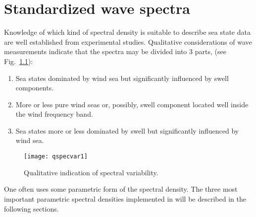 %
\chapter{Standardized wave spectra}
\label{cha:waveSpectra}
Knowledge of which kind of spectral density is suitable to describe
sea state data are well established from experimental studies.
Qualitative considerations of wave measurements indicate that the
spectra may be divided into 3 parts, (see Fig.~\ref{fig:qspecvar20}):
\begin{enumerate}\setlength\itemsep{0mm}
\item Sea states dominated by wind sea but significantly influenced
by swell components.
\item More or less pure wind seas or, possibly, swell component
  located well inside the wind frequency band.
\item Sea states more or less dominated by swell but significantly
influenced by wind sea.
\end{enumerate}
\begin{figure}[ht!]
 \begin{minipage}[b]{\linewidth}%
  \begin{center}
    \texttt{[image: qspecvar1]}
\vspace{-3mm}
\caption[Qualitative indication of spectral variability]
{Qualitative indication of spectral variability.} %
    \label{fig:qspecvar20} %
  \end{center}
 \end{minipage}
\end{figure}

One often uses some parametric form of the spectral density. The three
most important parametric spectral densities implemented in
\progname{} will be
described in the following sections.

